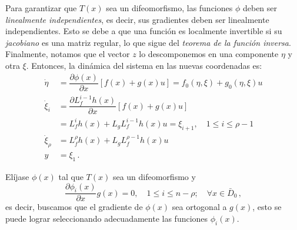 Para garantizar que $T(x)$ sea un difeomorfismo, las funciones $\phi$ deben ser \textit{linealmente independientes}, es decir, sus gradientes deben ser linealmente independientes. Esto se debe a que una función es localmente invertible si su \textit{jacobiano} es una matriz regular, lo que sigue del \textit{teorema de la función inversa}.\\

Finalmente, notamos que el vector $z$ lo descomponemos en una componente $\eta$ y otra $\xi$. Entonces, la dinámica del sistema en las nuevas coordenadas es:
\begin{equation}
	\begin{aligned}
		\dot{\eta}     & = \dfrac{\partial \phi(x)}{\partial x} \left[ f(x) + g(x)u \right] = f_0(\eta, \xi) + g_0(\eta, \xi)u \\
		\dot{\xi}_i    & = \dfrac{\partial L_f^{i-1} h(x)}{\partial x} \left[ f(x) + g(x)u \right]                             \\
		               & = L_f^i h(x) + L_g L_f^{i-1} h(x)u = \xi_{i+1}, \quad  1 \leq i \leq \rho-1                           \\
		\dot{\xi}_\rho & = L_f^\rho h(x) + L_g L_f^{\rho-1} h(x)u                                                              \\
		y              & = \xi_1 \, .
	\end{aligned}
	\label{eq:siso_normal}
\end{equation}

Elíjase $\phi(x)$ tal que $T(x)$ sea un difeomorfismo y
\begin{equation}
	\dfrac{\partial \phi_i(x)}{\partial x} g(x) = 0, \quad 1 \leq i \leq n-\rho; \quad \forall x \in \bar{D}_0 \, ,
\end{equation}
es decir, buscamos que el gradiente de $\phi(x)$ sea ortogonal a $g(x)$, esto se puede lograr seleccionando adecuadamente las funciones $\phi_i(x)$.\\


